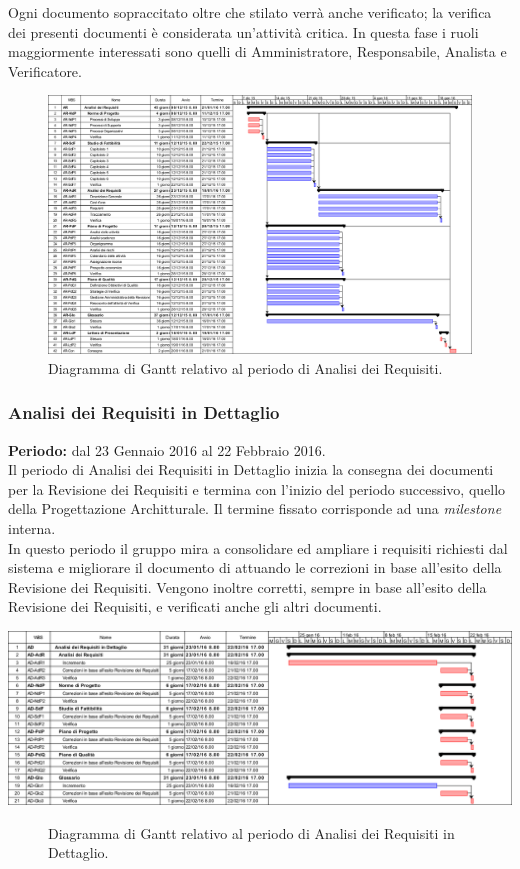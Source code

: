 Ogni documento sopraccitato oltre che stilato verrà anche verificato; la verifica dei presenti documenti è considerata un'attività critica.
In questa fase i ruoli maggiormente interessati sono quelli di Amministratore, Responsabile, Analista e Verificatore. 
\begin{figure}
	\centering
	\includegraphics[keepaspectratio = true, width=23cm]{immagini/PdP_AnalisiDeiRequisitiGantt.png}
	\caption{Diagramma di Gantt relativo al periodo di Analisi dei Requisiti.}\label{etichetta}
\end{figure}
\newpage

\subsubsection{Analisi dei Requisiti in Dettaglio}
\textbf{Periodo:} dal 23 Gennaio 2016 al 22 Febbraio 2016. \\
Il periodo di Analisi dei Requisiti in Dettaglio inizia la consegna dei documenti per la Revisione dei Requisiti e termina con l'inizio del periodo successivo, quello della Progettazione Architturale. Il termine fissato corrisponde ad una \textit{milestone} interna. \\
In questo periodo il gruppo mira a consolidare ed ampliare i requisiti richiesti dal sistema e migliorare il documento di \AdR attuando le correzioni in base all'esito della Revisione dei Requisiti.
Vengono inoltre corretti, sempre in base all'esito della Revisione dei Requisiti, e verificati anche gli altri documenti. 
 
\begin{center}
	\includegraphics[keepaspectratio = true, width=16cm]{immagini/PdP_AnalisiDeiRequisitiInDettaglioGantt.png}
\end{center}
\begin{figure}[h]
	\caption{Diagramma di Gantt relativo al periodo di Analisi dei Requisiti in Dettaglio.}\label{etichetta}
\end{figure}

